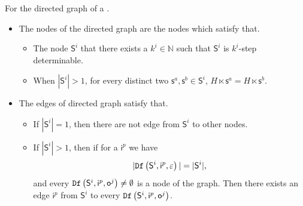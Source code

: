 \begin{definition}
For the directed graph of a \BCN.   
\begin{itemize}
\item The nodes of the directed graph are the nodes which satisfy that.
\begin{itemize}
\item  The node $\mathsf{S}^i$ that there exists a $k^{i}\in \mathbb{N}$ such that $\mathsf{S}^i$ is $k^{i}$-step determinable.
\item When $|\mathsf{S}^i|>1$, for every distinct two $\mathsf{s}^a, \mathsf{s}^b \in \mathsf{S}^i$, $H\ltimes\mathsf{s}^a=H\ltimes\mathsf{s}^b$. 
 \end{itemize}

\item The edges of directed graph satisfy that.
\begin{itemize}
 \item If $|\mathsf{S}^i|=1$, then there are not edge from $\mathsf{S}^i$ to other nodes.
 \item  If $|\mathsf{S}^i|>1$, then if for a $\mathsf{i}^p$ we have \[|{\tt Df}\left(\mathsf{S}^i,\mathsf{i}^p,\varepsilon\right)|=|\mathsf{S}^i|,\] and every ${\tt Df}\left(\mathsf{S}^i,\mathsf{i}^{p},\mathsf{o}^{j}\right)\ne\emptyset$ is a node of the graph. Then there exists an edge $\mathsf{i}^p$ from $\mathsf{S}^i$ to every ${\tt Df}\left(\mathsf{S}^i,\mathsf{i}^{p},\mathsf{o}^{j}\right)$.
 
 \end{itemize}
 \end{itemize}
\end{definition}

